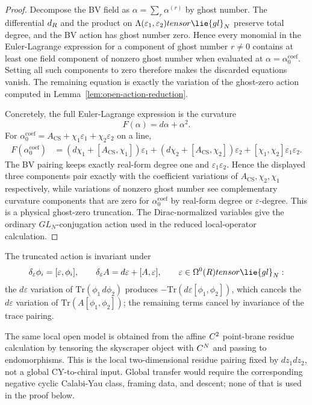 \documentclass[11pt]{memoir}
\begin{document}
\begin{proof}
  Decompose the BV field as $\alpha=\sum_r\alpha^{(r)}$ by ghost number. The
  differential $d_{R}$ and the product on
  $\Lambda(\varepsilon_1,\varepsilon_2)\otimes\lie{gl}_N$ preserve total degree,
  and the BV action has ghost number zero. Hence every monomial in the
  Euler-Lagrange expression for a component of ghost number $r\neq0$ contains
  at least one field component of nonzero ghost number when evaluated at
  $\alpha=\alpha_0^{\mathrm{coef}}$. Setting all such components to zero
  therefore makes the discarded equations vanish. The remaining equation is
  exactly the variation of the ghost-zero action computed in
  Lemma~\ref{lem:open-action-reduction}.

  Concretely, the full Euler-Lagrange expression is the curvature
  $$F(\alpha)=d\alpha+\alpha^2.$$
  For
  \(\alpha_0^{\mathrm{coef}}
    =A_{\mathrm{CS}}+\chi_1\varepsilon_1+\chi_2\varepsilon_2\) on a line,
  \begin{align*}
  F(\alpha_0^{\mathrm{coef}})
    &=(d\chi_1+[A_{\mathrm{CS}},\chi_1])\varepsilon_1
      +(d\chi_2+[A_{\mathrm{CS}},\chi_2])\varepsilon_2
      +[\chi_1,\chi_2]\varepsilon_1\varepsilon_2.
  \end{align*}
  The BV pairing keeps exactly real-form degree one and
  $\varepsilon_1\varepsilon_2$. Hence the displayed three components pair exactly
  with the coefficient variations of \(A_{\mathrm{CS}},\chi_2,\chi_1\)
  respectively, while variations of
  nonzero ghost number see complementary curvature components that are zero for
  \(\alpha_0^{\mathrm{coef}}\) by real-form degree or
  \(\varepsilon\)-degree.  This is a physical ghost-zero truncation.  The
  Dirac-normalized variables give the ordinary \(GL_N\)-conjugation action
  used in the reduced local-operator calculation.
\end{proof}

The truncated action is invariant under
$$\delta_{\varepsilon}\phi_i=[\varepsilon,\phi_i],\qquad
  \delta_{\varepsilon}A=d\varepsilon+[A,\varepsilon],
  \qquad \varepsilon\in\Omega^0(\R)\otimes\lie{gl}_N:$$
the $d\varepsilon$ variation of $\mathrm{Tr}(\phi_1\,d\phi_2)$ produces
$-\mathrm{Tr}(d\varepsilon[\phi_1,\phi_2])$, which cancels the $d\varepsilon$
variation of $\mathrm{Tr}(A[\phi_1,\phi_2])$; the remaining terms cancel by
invariance of the trace pairing.

\begin{rmk}
  The same local open model is obtained from the affine \(C^2\)
  point-brane residue calculation by tensoring the skyscraper object with
  $C^N$ and passing to endomorphisms. This is the local
  two-dimensional residue pairing fixed by \(dz_1dz_2\), not a global
  CY-to-chiral input. Global transfer would require the corresponding
  negative cyclic Calabi-Yau class, framing data, and descent; none of
  that is used in the proof below.
\end{rmk}
\end{document}

